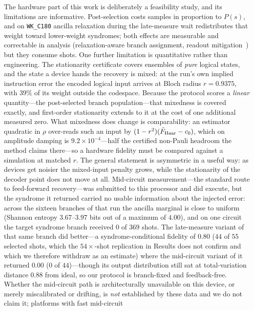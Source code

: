 \documentclass[aps,prxquantum,reprint,superscriptaddress]{revtex4-2}
\begin{document}
The hardware part of this work is deliberately a feasibility study, and its
limitations are informative. Post-selection costs samples in proportion to
$P(s)$, and on \texttt{WK\_C180} ancilla relaxation during the late-measure
wait redistributes that weight toward lower-weight syndromes; both effects
are measurable and correctable in analysis (relaxation-aware branch
assignment, readout mitigation~\cite{vandenberg_readout}) but they consume
shots. One further limitation is quantitative rather than engineering. The
stationarity certificate covers ensembles of \emph{pure} logical states, and the
state a device hands the recovery is mixed: at the run's own implied instruction
error the encoded logical input arrives at Bloch radius $r=0.9375$, with $39\%$ of
its weight outside the codespace. Because the protocol scores a \emph{linear}
quantity---the post-selected branch population---that mixedness is covered exactly,
and first-order stationarity extends to it at the cost of one additional measured
zero. What mixedness does change is comparability: an estimator quadratic in
$\rho$ over-reads such an input by $(1-r^2)(\bar F_{\rm Haar}-c_0)$, which on
amplitude damping is $9.2\times10^{-4}$---half the certified non-Pauli headroom the
method claims there---so a hardware fidelity must be compared against a simulation
at matched $r$. The general statement is asymmetric in a useful way: as devices get
noisier the mixed-input penalty grows, while the stationarity of the decoder point
does not move at all. Mid-circuit measurement---the standard route to feed-forward
recovery---was submitted to this processor and did execute, but the syndrome it
returned carried no usable information about the injected error: across the
sixteen branches of that run the ancilla marginal is close to uniform (Shannon
entropy $3.67$--$3.97$ bits out of a maximum of $4.00$), and on one circuit the
target syndrome branch received $0$ of $369$ shots. The late-measure variant of
that same branch did better---a syndrome-conditional fidelity of $0.80$ ($44$ of
$55$ selected shots, which the $54\times$-shot replication in Results does not
confirm and which we therefore withdraw as an estimate) where the mid-circuit
variant of it returned $0.00$ ($0$ of
$44$)---though its output distribution still sat at total-variation distance
$0.88$ from ideal, so our protocol is branch-fixed and feedback-free. Whether the
mid-circuit path is architecturally unavailable on this device, or merely
miscalibrated or drifting, is \emph{not} established by these
data and we do not claim it; platforms with fast mid-circuit
\end{document}
